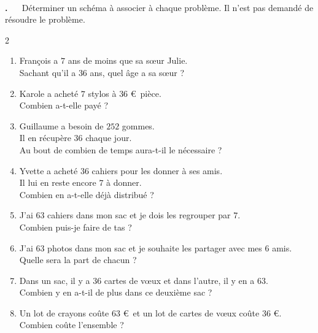 \documentclass[10pt,a4paper]{article}
\newcounter{exo}
\newcommand{\exo}[1][]{%
  \refstepcounter{exo}%
  \textbf{\textcolor{Couleur8}{\\[0.3cm]\theexo.}}%
  \if\relax\detokenize{#1}\relax\else\ \textbf{#1}\fi\ %
}
\begin{document}
\exo Déterminer un schéma à associer à chaque problème. Il n'est pas demandé de résoudre le problème.
\begin{multicols}{2}
\begin{enumerate}[itemsep=1em]
	\item François a $7$ ans de moins que sa s\oe ur Julie.\\Sachant qu'il a $36$ ans, quel âge a sa s\oe ur ?
	\item Karole a acheté $7$ stylos à $36$ €~pièce.\\Combien a-t-elle payé ?
	\item Guillaume a besoin de $252$ gommes.\\Il en récupère $36$ chaque jour.\\Au bout de combien de temps aura-t-il le nécessaire ?
	\item Yvette a acheté $36$ cahiers pour les donner à ses amis.\\Il lui en reste encore $7$ à donner.\\Combien en a-t-elle déjà distribué ?
	\columnbreak
	\item J'ai $63$ cahiers dans mon sac et je dois les regrouper par $7$.\\Combien puis-je faire de tas ?
	\item J'ai $63$ photos dans mon sac et je souhaite les partager avec mes $6$ amis.\\Quelle sera la part de chacun ?
	\item Dans un sac, il y a $36$ cartes de v\oe ux et dans l'autre, il y en a $63$.\\Combien y en a-t-il de plus dans ce deuxième sac ?
	\item Un lot de crayons coûte $63$ €~et un lot de cartes de v\oe ux coûte $36$ €.\\Combien coûte l'ensemble ?
\end{enumerate}
 \end{multicols}
\end{document}
